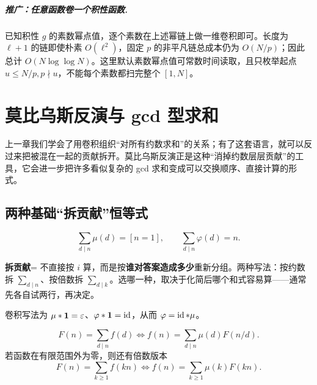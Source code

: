 \paragraph{推广：任意函数卷一个积性函数.}
已知积性 $g$ 的素数幂点值，逐个素数在上述幂链上做一维卷积即可。长度为 $\ell+1$ 的链即使朴素 $O(\ell^2)$，固定 $p$ 的非平凡链总成本仍为 $O(N/p)$；因此总计 $O(N\log\log N)$。这里默认素数幂点值可常数时间读取，且只枚举起点 $u\le N/p,p\nmid u$，不能每个素数都扫完整个 $[1,N]$。



\chapter{莫比乌斯反演与 gcd 型求和}
\begin{chapterintro}[章节导读]
上一章我们学会了用卷积组织“对所有约数求和”的关系；有了这套语言，就可以反过来把被混在一起的贡献拆开。莫比乌斯反演正是这种“消掉约数层层贡献”的工具，它会进一步把许多看似复杂的 gcd 求和变成可以交换顺序、直接计算的形式。
\end{chapterintro}

\section{两种基础“拆贡献”恒等式}
\[
\sum_{d\mid n}\mu(d)=[n=1],\qquad
\sum_{d\mid n}\varphi(d)=n.
\]

\begin{tip}[词义：拆贡献]
\textbf{拆贡献}= 不直接按 $i$ 算，而是按\textbf{谁对答案造成多少}重新分组。两种写法：按约数拆 $\sum_{d\mid n}$、按倍数拆 $\sum_{d\mid k}$。选哪一种，取决于化简后哪个和式容易算——通常先各自试两行，再决定。
\end{tip}

卷积写法为 $\mu*\mathbf 1=\varepsilon$、$\varphi*\mathbf 1=\operatorname{id}$，从而 $\varphi=\operatorname{id}*\mu$。
\begin{theorem}[莫比乌斯反演]
\[
 F(n)=\sum_{d\mid n}f(d)
 \iff f(n)=\sum_{d\mid n}\mu(d)F(n/d).
\]
若函数在有限范围外为零，则还有倍数版本
\[
 F(n)=\sum_{k\ge1}f(kn)
 \iff f(n)=\sum_{k\ge1}\mu(k)F(kn).
\]
\end{theorem}

